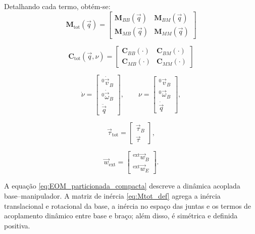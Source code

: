 Detalhando cada termo, obtém-se:
\begin{equation}
\label{eq:Mtot_def}
\mathbf M_{\text{tot}}(\vec q)
=
\begin{bmatrix}
\mathbf M_{BB}(\vec q) & \mathbf M_{BM}(\vec q) \\
\mathbf M_{MB}(\vec q) & \mathbf M_{MM}(\vec q)
\end{bmatrix}
\end{equation}

\begin{equation}
\label{eq:Ctot_def}
\mathbf C_{\text{tot}}(\vec q,\nu)
=
\begin{bmatrix}
\mathbf C_{BB}(\cdot) & \mathbf C_{BM}(\cdot) \\
\mathbf C_{MB}(\cdot) & \mathbf C_{MM}(\cdot)
\end{bmatrix}
\end{equation}

\begin{equation}
\label{eq:stacked_defs1}
\dot{\nu} =
\begin{bmatrix}
{}^{0} \dot{\vec v}_{B} \\
{}^{0} \dot{\vec \omega}_{B} \\
\ddot{\vec q}
\end{bmatrix},
\qquad
\nu =
\begin{bmatrix}
{}^{0} \vec v_{B} \\
{}^{0} \vec \omega_{B} \\
\dot{\vec q}
\end{bmatrix},
\end{equation}

\begin{equation}
\label{eq:stacked_tau}
\vec\tau_{\text{tot}} =
\begin{bmatrix}
\vec \tau_{B} \\
\vec \tau
\end{bmatrix},
\end{equation}

\begin{equation}
\label{eq:stacked_wrench}
\vec w_{\text{ext}} =
\begin{bmatrix}
{}^{\text{ext}}\vec w_{B} \\
{}^{\text{ext}}\vec w_{E}
\end{bmatrix}.
\end{equation}

A equação \eqref{eq:EOM_particionada_compacta} descreve a dinâmica acoplada base--manipulador.
A matriz de inércia \eqref{eq:Mtot_def} agrega a inércia translacional e rotacional da base, a inércia no espaço das juntas e os termos de acoplamento dinâmico entre base e braço; além disso, é simétrica e definida positiva.


